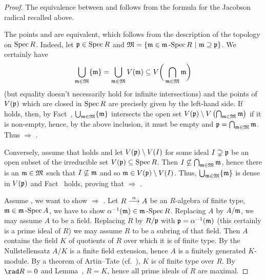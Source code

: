 \documentclass[a4paper,parskip=half,numbers=enddot, DIV=12]{scrreprt}
\begin{document}
\begin{proof}
    The equivalence between  and  follows from the formula for the Jacobson radical recalled above.
    
    The points  and  are equivalent, which follows from the description of the topology on $\operatorname{Spec} R$. Indeed, let $\mathfrak{p}\in\operatorname{Spec} R$ and $\mathfrak{M}=\left\{\mathfrak{m}\in\mathfrak{m}\operatorname{-Spec} R\ \middle|\  \mathfrak{m}\supseteq\mathfrak{p}\right\}$. We certainly have 
    \begin{align*}
    	\bigcup_{\mathfrak{m}\in\mathfrak{M}}\{\mathfrak{m}\}=\bigcup_{\mathfrak{m}\in\mathfrak{M}}V(\mathfrak{m})\subseteq V\bigg(\bigcap_{\mathfrak{m}\in\mathfrak{M}}\mathfrak{m}\bigg)
    \end{align*}
     (but equality doesn't necessarily hold for infinite intersections) and the points of $V(\mathfrak{p})$ which are closed in $\operatorname{Spec} R$ are precisely given by the left-hand side. If  holds, then, by Fact~, $\bigcup_{\mathfrak{m}\in\mathfrak{M}}\{\mathfrak{m}\}$ intersects the open set $V(\mathfrak{p})\setminus V\left(\bigcap_{\mathfrak{m}\in\mathfrak{M}}\mathfrak{m}\right)$ if it is non-empty, hence, by the above inclusion, it must be empty and $\mathfrak{p}=\bigcap_{\mathfrak{m}\in\mathfrak{M}}\mathfrak{m}$. Thus  $\Rightarrow$ .
     
     Conversely, assume that  holds and let $V(\mathfrak{p})\setminus V(I)$ for some ideal $I\supsetneq\mathfrak{p}$ be an open subset of the irreducible set $V(\mathfrak{p})\subseteq \operatorname{Spec} R$. Then $I\not\subseteq \bigcap_{\mathfrak{m}\in\mathfrak{M}}\mathfrak{m}$, hence there is an $\mathfrak{m}\in\mathfrak{M}$ such that $I\not\subseteq\mathfrak{m}$ and so $\mathfrak{m}\in V(\mathfrak{p})\setminus V(I)$. Thus, $\bigcup_{\mathfrak{m}\in\mathfrak{M}}\{\mathfrak{m}\}$ is dense in $V(\mathfrak{p})$ and Fact~ holds, proving that  $\Rightarrow$ .
    
    Assume , we want to show  $\Rightarrow$ . Let $R\morphism[\alpha]A$ be an $R$-algebra of finite type, $\mathfrak{m}\in \mathfrak{m}\operatorname{-Spec} A$, we have to show $\alpha^{-1}(\mathfrak{m}) \in \mathfrak{m}\operatorname{-Spec} R$. Replacing $A$ by $A/\mathfrak{m}$, we may assume $A$ to be a field. Replacing $R$ by $R/\mathfrak{p}$ with $\mathfrak{p} = \alpha^{-1}(\mathfrak{m})$ (this certainly is a prime ideal of $R$) we may assume $R$ to be a subring of that field. Then $A$ contains the field $K$ of quotients of $R$ over which it is of finite type. By the Nullstellensatz $A/K$ is a finite field extension, hence $A$ is a finitely generated $K$-module. By a theorem of Artin--Tate (cf.\ \cite[Proposition~1.4.2]{alg1}), $K$ is of finite type over $R$. By $\rad R = 0$ and Lemma~, $R=K$, hence all prime ideals of $R$ are maximal. 
    

\end{proof}
\end{document}
